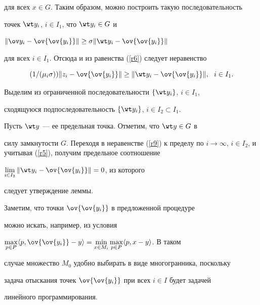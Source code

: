 \begin{pf}
для всех $x\in G$. Таким образом, можно построить такую последовательность


точек $\wt y_i$, $i\in I_1$, что $\wt y_i \in G$ и


$\| \ov y_i -\ov{\ov{y_i}}\| \ge \sigma \| \wt y_i- \ov{\ov{y_i}}\|$


для всех $i\in I_1$. Отсюда и из равенства (\ref{r6}) следует неравенство




\begin{equation} \label{r9}


(1/(\mu_i \sigma))\| z_i -\ov{\ov{y_i}}\|


\ge \| \wt y_i- \ov{\ov{y_i}}\|, \ \ i\in I_1.


\end{equation}


%


Выделим из ограниченной последовательности $\{ \wt y_i\}$, $i\in I_1$,


сходящуюся подпоследовательность $\{ \wt y_i\}$, $i\in I_2\subset I_1$.


Пусть $\wt y$ --- ее предельная точка. Отметим, что $\wt y\in G$ в


силу замкнутости $G$. Переходя в неравенстве (\ref{r9}) к пределу по $i\to


\infty$, $i\in I_2$, и учитывая (\ref{r5}), получим предельное соотношение


$\lim \limits_{i\in I_2} \|\wt y_i- \ov{\ov{y_i}}\|=0$, из которого


следует утверждение леммы.


\end{pf}








Заметим, что точки $\ov{\ov{y_i}}$ в предложенной процедуре


можно искать, например, из условия


$\max \limits_{p\in P} \la p,\ov{\ov{y_i}}-y \ra =


\min \limits_{x\in M_i} \max \limits_{p\in P}\la p,x-y \ra $. В таком


случае множество $M_0$ удобно выбирать в виде многогранника, поскольку


задача отыскания точек $\ov{\ov{y_i}}$ при всех $i\in I$ будет задачей


линейного программирования.





